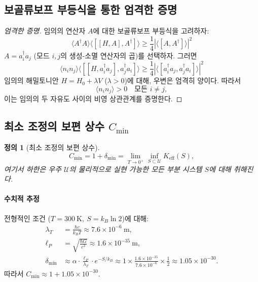 \documentclass[11pt,a4paper]{article}
\newtheorem{definition}{정의}
\begin{document}
\subsection{보골류보프 부등식을 통한 엄격한 증명}

\begin{proof}[엄격한 증명]
	임의의 연산자 $A$에 대한 보골류보프 부등식을 고려하자:
	\begin{equation}
		\langle A^\dagger A \rangle \langle [[H, A], A^\dagger] \rangle \geq \frac{1}{4} |\langle [A, A^\dagger] \rangle|^2
	\end{equation}
	$A = a_i^\dagger a_j$ (모드 $i,j$의 생성-소멸 연산자의 곱)를 선택하자. 그러면
	\begin{equation}
		\langle n_i n_j \rangle \langle [[H, a_i^\dagger a_j], a_j^\dagger a_i] \rangle \geq \frac{1}{4} |\langle [a_i^\dagger a_j, a_j^\dagger a_i] \rangle|^2
	\end{equation}
	임의의 해밀토니안 $H = H_0 + \lambda V$ ($\lambda > 0$)에 대해, 우변은 엄격히 양이다. 따라서
	\begin{equation}
		\langle n_i n_j \rangle > 0 \quad \text{모든 } i \neq j,
	\end{equation}
	이는 임의의 두 자유도 사이의 비영 상관관계를 증명한다.
\end{proof}

\subsection{최소 조정의 보편 상수 $C_{\min}$}

\begin{definition}[최소 조정의 보편 상수]
	\[
	C_{\min} = 1 + \delta_{\min} = \lim_{T \to 0^+} \inf_{S \subset \mathcal{U}} K_{\mathrm{eff}}(S),
	\]
	여기서 하한은 우주 $\mathcal{U}$의 물리적으로 실현 가능한 모든 부분 시스템 $S$에 대해 취해진다.
\end{definition}

\paragraph{수치적 추정}
전형적인 조건 ($T = 300\ \mathrm{K},\ S = k_B \ln 2$)에 대해:
\begin{align*}
	\lambda_T &= \frac{\hbar c}{k_B T} \approx 7.6 \times 10^{-6}\ \mathrm{m},\\[2pt]
	\ell_P &= \sqrt{\frac{\hbar G}{c^3}} \approx 1.6 \times 10^{-35}\ \mathrm{m},\\[2pt]
	\delta_{\min} &\approx \alpha \cdot \frac{\ell_P}{\lambda_T} \cdot e^{-S/k_B}
	\approx 1 \times \frac{1.6 \times 10^{-35}}{7.6 \times 10^{-6}} \times \frac{1}{2}
	\approx 1.05 \times 10^{-30}.
\end{align*}
따라서 $C_{\min} \approx 1 + 1.05 \times 10^{-30}$.
\end{document}
